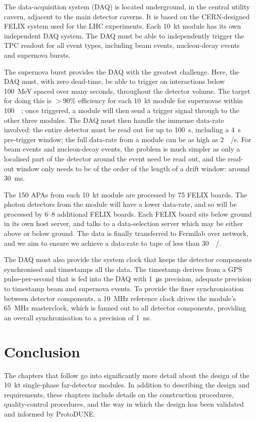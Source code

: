 The data-acquisition system (DAQ) is located underground, in the central utility cavern, adjacent to the main detector caverns. It is based on the CERN-designed FELIX system used for the LHC experiments. Each \SI{10}{\kilo\tonne} module has its own independent DAQ system. The DAQ must be able to independently trigger the TPC readout for all event types, including beam events, nucleon-decay events and supernova bursts.

The supernova burst provides the DAQ with the greatest challenge. Here, the DAQ must, with zero dead-time, be able to trigger on interactions below \SI{100}{\mega\electronvolt} spaced over many seconds, throughout the detector volume. The target for doing this is $>\!90\%$ efficiency for each \SI{10}{\kilo\tonne} module for supernovae within \SI{100}{\kilo\parsec}; once triggered, a module will then send a trigger signal through to the other three modules. The DAQ must then handle the immense data-rate involved: the entire detector must be read out for up to \SI{100}{\second}, including a \SI{4}{\second} pre-trigger window; the full data-rate from a module can be as high as \SI{2}{\tera\byte/\second}. For beam events and nucleon-decay events, the problem is much simpler as only a localised part of the detector around the event need be read out, and the read-out window only needs to be of the order of the length of a drift window: around \SI{30}{\milli\second}.

The 150 APAs from each \SI{10}{\kilo\tonne} module are processed by 75 FELIX boards. The photon detectors from the module will have a lower data-rate, and so will be processed by 6--8 additional FELIX boards. Each FELIX board sits below ground in its own host server, and talks to a data-selection server which may be either above or below ground. The data is finally transferred to Fermilab over network, and we aim to ensure we achieve a data-rate to tape of less than \SI{30}{\peta\byte/\year}.

The DAQ must also provide the system clock that keeps the detector components synchronised and timestamps all the data. The timestamp derives from a GPS pulse-per-second that is fed into the DAQ with \SI{1}{\micro\second} precision, adequate precision to timestamp beam and supernova events. To provide the finer synchronisation between detector components, a \SI{10}{\mega\hertz} reference clock drives the module's \SI{65}{\mega\hertz} masterclock, which is fanned out to all detector components, providing an overall synchronisation to a precision of \SI{1}{\nano\second}.

\section{Conclusion}
\label{sec:fdsp-exec-conclusion}

The chapters that follow go into significantly more detail about the design of the \SI{10}{\kilo\tonne} single-phase far-detector modules. In addition to describing the design and requirements, these chapters include details on the construction procedures, quality-control procedures, and the way in which the design has been validated and informed by ProtoDUNE.

